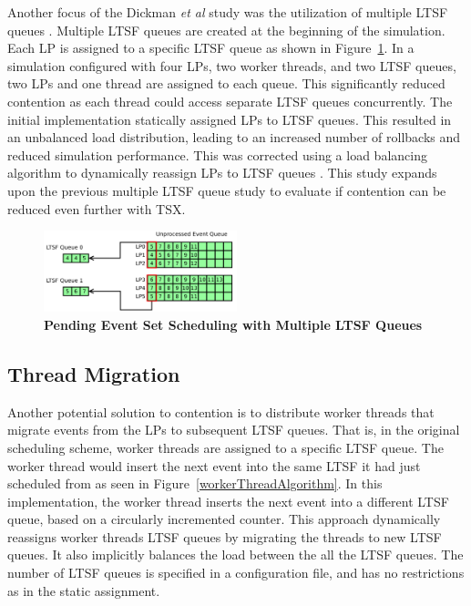 \documentclass{sig-alternate}
\begin{document}
Another focus of the Dickman \emph{et al} study was the utilization of multiple LTSF
queues \cite{dickman}.  Multiple LTSF queues are created at the beginning of the
simulation.  Each LP is assigned to a specific LTSF queue as shown in
Figure~\ref{fig:multipleLTSF}.  In a simulation configured with four LPs, two worker
threads, and two LTSF queues, two LPs and one thread are assigned to each queue.  This
significantly reduced contention as each thread could access separate LTSF queues
concurrently.  The initial implementation statically assigned LPs to LTSF queues.  This
resulted in an unbalanced load distribution, leading to an increased number of rollbacks
and reduced simulation performance.  This was corrected using a load balancing algorithm
to dynamically reassign LPs to LTSF queues \cite{dickman}.  This study expands upon the
previous multiple LTSF queue study to evaluate if contention can be reduced even further 
with TSX.

\begin{figure}
    \centering
    \graphicspath{ {./figures/} }
    \includegraphics[width=0.5\textwidth,keepaspectratio]{multiple_ltsf}
    \caption{\textbf{Pending Event Set Scheduling with Multiple LTSF
        Queues}}\label{fig:multipleLTSF}
\end{figure}

\subsection{Thread Migration}

Another potential solution to contention is to distribute worker threads that migrate
events from the LPs to subsequent LTSF queues.  That is, in the original scheduling
scheme, worker threads are assigned to a specific LTSF queue.  The worker thread would
insert the next event into the same LTSF it had just scheduled from as seen in
Figure~\ref{workerThreadAlgorithm}.  In this implementation, the worker thread inserts the
next event into a different LTSF queue, based on a circularly incremented counter.  This
approach dynamically reassigns worker threads LTSF queues by migrating the threads to new
LTSF queues.  It also implicitly balances the load between the all the LTSF queues.  The
number of LTSF queues is specified in a configuration file, and has no restrictions as in
the static assignment.
\end{document}
